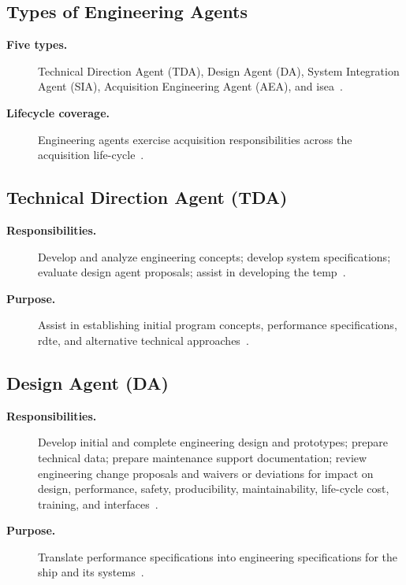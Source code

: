 \documentclass[../main.tex]{subfiles}
\begin{document}
\subsection{Types of Engineering Agents}
\begin{description}
  \item[\textbf{Five types.}] Technical Direction Agent (TDA), Design Agent (DA), System Integration Agent (SIA), Acquisition Engineering Agent (AEA), and \ac{isea}~\autocite{edo-2-1-5-technical-authority-2025}.
  \item[\textbf{Lifecycle coverage.}] Engineering agents exercise acquisition responsibilities across the acquisition life-cycle~\autocite{edo-2-1-5-technical-authority-2025}.
\end{description}

\subsection{Technical Direction Agent (TDA)}
\begin{description}
  \item[\textbf{Responsibilities.}] Develop and analyze engineering concepts; develop system specifications; evaluate design agent proposals; assist in developing the \ac{temp}~\autocite{edo-2-1-5-technical-authority-2025}.
  \item[\textbf{Purpose.}] Assist in establishing initial program concepts, performance specifications, \ac{rdte}, and alternative technical approaches~\autocite{edo-2-1-5-technical-authority-2025}.
\end{description}

\subsection{Design Agent (DA)}
\begin{description}
  \item[\textbf{Responsibilities.}] Develop initial and complete engineering design and prototypes; prepare technical data; prepare maintenance support documentation; review engineering change proposals and waivers or deviations for impact on design, performance, safety, producibility, maintainability, life-cycle cost, training, and interfaces~\autocite{edo-2-1-5-technical-authority-2025}.
  \item[\textbf{Purpose.}] Translate performance specifications into engineering specifications for the ship and its systems~\autocite{edo-2-1-5-technical-authority-2025}.
\end{description}
\end{document}

